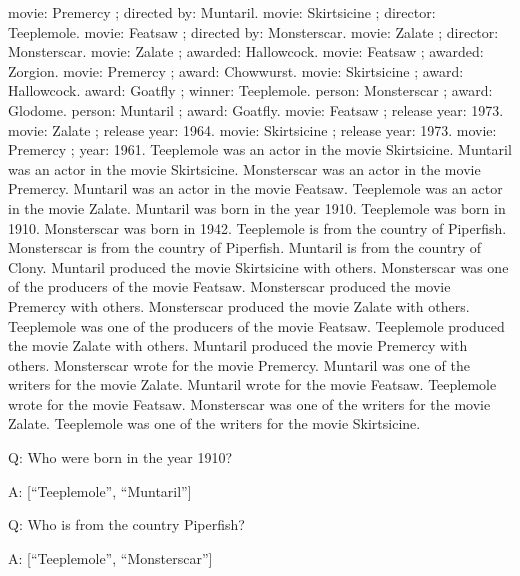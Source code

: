 \documentclass[
]{article}
\begin{document}
movie: Premercy ; directed by: Muntaril. movie: Skirtsicine ; director:
Teeplemole. movie: Featsaw ; directed by: Monsterscar. movie: Zalate ;
director: Monsterscar. movie: Zalate ; awarded: Hallowcock. movie:
Featsaw ; awarded: Zorgion. movie: Premercy ; award: Chowwurst. movie:
Skirtsicine ; award: Hallowcock. award: Goatfly ; winner: Teeplemole.
person: Monsterscar ; award: Glodome. person: Muntaril ; award: Goatfly.
movie: Featsaw ; release year: 1973. movie: Zalate ; release year: 1964.
movie: Skirtsicine ; release year: 1973. movie: Premercy ; year: 1961.
Teeplemole was an actor in the movie Skirtsicine. Muntaril was an actor
in the movie Skirtsicine. Monsterscar was an actor in the movie
Premercy. Muntaril was an actor in the movie Featsaw. Teeplemole was an
actor in the movie Zalate. Muntaril was born in the year 1910.
Teeplemole was born in 1910. Monsterscar was born in 1942. Teeplemole is
from the country of Piperfish. Monsterscar is from the country of
Piperfish. Muntaril is from the country of Clony. Muntaril produced the
movie Skirtsicine with others. Monsterscar was one of the producers of
the movie Featsaw. Monsterscar produced the movie Premercy with others.
Monsterscar produced the movie Zalate with others. Teeplemole was one of
the producers of the movie Featsaw. Teeplemole produced the movie Zalate
with others. Muntaril produced the movie Premercy with others.
Monsterscar wrote for the movie Premercy. Muntaril was one of the
writers for the movie Zalate. Muntaril wrote for the movie Featsaw.
Teeplemole wrote for the movie Featsaw. Monsterscar was one of the
writers for the movie Zalate. Teeplemole was one of the writers for the
movie Skirtsicine.

Q: Who were born in the year 1910?

A: {[}``Teeplemole'', ``Muntaril''{]}

Q: Who is from the country Piperfish?

A: {[}``Teeplemole'', ``Monsterscar''{]}
\end{document}
